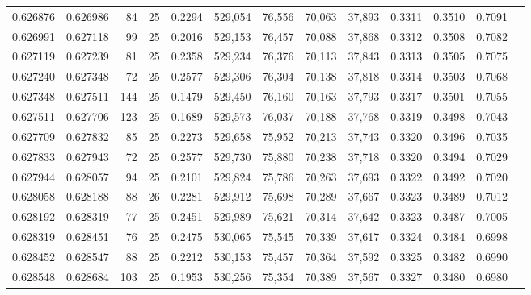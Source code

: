 \begin{tabular}{rrrrrrrrrrrrr}
0.626876 & 0.626986 &    84 &  25 &                                     0.2294 & 529,054 &  76,556 &  70,063 &  37,893 & 0.3311 & 0.3510 & 0.7091 \\
0.626991 & 0.627118 &    99 &  25 &                                     0.2016 & 529,153 &  76,457 &  70,088 &  37,868 & 0.3312 & 0.3508 & 0.7082 \\
0.627119 & 0.627239 &    81 &  25 &                                     0.2358 & 529,234 &  76,376 &  70,113 &  37,843 & 0.3313 & 0.3505 & 0.7075 \\
0.627240 & 0.627348 &    72 &  25 &                                     0.2577 & 529,306 &  76,304 &  70,138 &  37,818 & 0.3314 & 0.3503 & 0.7068 \\
0.627348 & 0.627511 &   144 &  25 &                                     0.1479 & 529,450 &  76,160 &  70,163 &  37,793 & 0.3317 & 0.3501 & 0.7055 \\
0.627511 & 0.627706 &   123 &  25 &                                     0.1689 & 529,573 &  76,037 &  70,188 &  37,768 & 0.3319 & 0.3498 & 0.7043 \\
0.627709 & 0.627832 &    85 &  25 &                                     0.2273 & 529,658 &  75,952 &  70,213 &  37,743 & 0.3320 & 0.3496 & 0.7035 \\
0.627833 & 0.627943 &    72 &  25 &                                     0.2577 & 529,730 &  75,880 &  70,238 &  37,718 & 0.3320 & 0.3494 & 0.7029 \\
0.627944 & 0.628057 &    94 &  25 &                                     0.2101 & 529,824 &  75,786 &  70,263 &  37,693 & 0.3322 & 0.3492 & 0.7020 \\
0.628058 & 0.628188 &    88 &  26 &                                     0.2281 & 529,912 &  75,698 &  70,289 &  37,667 & 0.3323 & 0.3489 & 0.7012 \\
0.628192 & 0.628319 &    77 &  25 &                                     0.2451 & 529,989 &  75,621 &  70,314 &  37,642 & 0.3323 & 0.3487 & 0.7005 \\
0.628319 & 0.628451 &    76 &  25 &                                     0.2475 & 530,065 &  75,545 &  70,339 &  37,617 & 0.3324 & 0.3484 & 0.6998 \\
0.628452 & 0.628547 &    88 &  25 &                                     0.2212 & 530,153 &  75,457 &  70,364 &  37,592 & 0.3325 & 0.3482 & 0.6990 \\
0.628548 & 0.628684 &   103 &  25 &                                     0.1953 & 530,256 &  75,354 &  70,389 &  37,567 & 0.3327 & 0.3480 & 0.6980 \\

\end{tabular}
